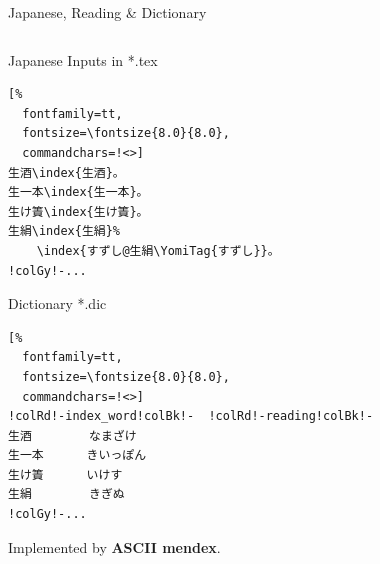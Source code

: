 \documentclass[aspectratio=169,10pt]{beamer}
\begin{document}
\begin{frame}[fragile]{Japanese, Reading \& Dictionary}

\begin{columns}
\begin{column}{70mm}
\begin{exampleblock}{Japanese Inputs in *.tex}
\begin{Verbatim}[%
  fontfamily=tt,
  fontsize=\fontsize{8.0}{8.0},
  commandchars=!<>]
生酒\index{生酒}。
生一本\index{生一本}。
生け簀\index{生け簀}。
生絹\index{生絹}%
    \index{すずし@生絹\YomiTag{すずし}}。
!colGy!-...
\end{Verbatim}
\end{exampleblock}
\begin{exampleblock}{Dictionary *.dic}
\begin{Verbatim}[%
  fontfamily=tt,
  fontsize=\fontsize{8.0}{8.0},
  commandchars=!<>]
!colRd!-index_word!colBk!-  !colRd!-reading!colBk!-
生酒        なまざけ
生一本      きいっぽん
生け簀      いけす
生絹        きぎぬ
!colGy!-...
\end{Verbatim}
\end{exampleblock}
{\footnotesize Implemented by \textbf{ASCII mendex}.}
\end{column}

\begin{column}{60mm}
\begin{center}
%
\end{center}
\end{column}
\end{columns}

\end{frame}

\end{document}
